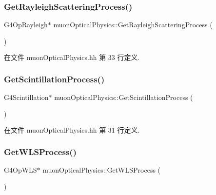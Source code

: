 \subsubsection{\texorpdfstring{Get\+Rayleigh\+Scattering\+Process()}{GetRayleighScatteringProcess()}}
{\footnotesize\ttfamily G4\+Op\+Rayleigh$\ast$ muon\+Optical\+Physics\+::\+Get\+Rayleigh\+Scattering\+Process (\begin{DoxyParamCaption}{ }\end{DoxyParamCaption})\hspace{0.3cm}{\ttfamily [inline]}}



在文件 muon\+Optical\+Physics.\+hh 第 33 行定义.

\mbox{\label{classmuonOpticalPhysics_acda9b8ac8d073939523c861833c343ce}} 
\subsubsection{\texorpdfstring{Get\+Scintillation\+Process()}{GetScintillationProcess()}}
{\footnotesize\ttfamily G4\+Scintillation$\ast$ muon\+Optical\+Physics\+::\+Get\+Scintillation\+Process (\begin{DoxyParamCaption}{ }\end{DoxyParamCaption})\hspace{0.3cm}{\ttfamily [inline]}}



在文件 muon\+Optical\+Physics.\+hh 第 31 行定义.

\mbox{\label{classmuonOpticalPhysics_a257a178b6e1a98c10d9001fe43d0b1c8}} 
\subsubsection{\texorpdfstring{Get\+W\+L\+S\+Process()}{GetWLSProcess()}}
{\footnotesize\ttfamily G4\+Op\+W\+LS$\ast$ muon\+Optical\+Physics\+::\+Get\+W\+L\+S\+Process (\begin{DoxyParamCaption}{ }\end{DoxyParamCaption})\hspace{0.3cm}{\ttfamily [inline]}}



